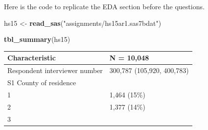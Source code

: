 \documentclass[]{article}
\newenvironment{Shaded}{\begin{snugshade}}{\end{snugshade}}
\newcommand{\KeywordTok}[1]{\textcolor[rgb]{0.13,0.29,0.53}{\textbf{#1}}}
\newcommand{\NormalTok}[1]{#1}
\newcommand{\StringTok}[1]{\textcolor[rgb]{0.31,0.60,0.02}{#1}}
\begin{document}
Here is the code to replicate the EDA section before the questions.

\begin{Shaded}
\begin{Highlighting}[]
\NormalTok{hs15 <-}\StringTok{ }\KeywordTok{read_sas}\NormalTok{(}\StringTok{"assignments/hs15ar1.sas7bdat"}\NormalTok{)}

\KeywordTok{tbl_summary}\NormalTok{(hs15)}
\end{Highlighting}
\end{Shaded}

\begin{longtable}[]{@{}ll@{}}
\toprule
\begin{minipage}[b]{0.71\columnwidth}\raggedright
\textbf{Characteristic}\strut
\end{minipage} & \begin{minipage}[b]{0.23\columnwidth}\raggedright
\textbf{N = 10,048}\strut
\end{minipage}\tabularnewline
\midrule
\endhead
\begin{minipage}[t]{0.71\columnwidth}\raggedright
Respondent interviewer number\strut
\end{minipage} & \begin{minipage}[t]{0.23\columnwidth}\raggedright
300,787 (105,920, 400,783)\strut
\end{minipage}\tabularnewline
\begin{minipage}[t]{0.71\columnwidth}\raggedright
S1 County of residence\strut
\end{minipage} & \begin{minipage}[t]{0.23\columnwidth}\raggedright
\strut
\end{minipage}\tabularnewline
\begin{minipage}[t]{0.71\columnwidth}\raggedright
1\strut
\end{minipage} & \begin{minipage}[t]{0.23\columnwidth}\raggedright
1,464 (15\%)\strut
\end{minipage}\tabularnewline
\begin{minipage}[t]{0.71\columnwidth}\raggedright
2\strut
\end{minipage} & \begin{minipage}[t]{0.23\columnwidth}\raggedright
1,377 (14\%)\strut
\end{minipage}\tabularnewline
\begin{minipage}[t]{0.71\columnwidth}\raggedright
3\strut
\end{minipage} & \begin{minipage}[t]{0.23\columnwidth}\raggedright

\end{minipage}
\end{longtable}
\end{document}
